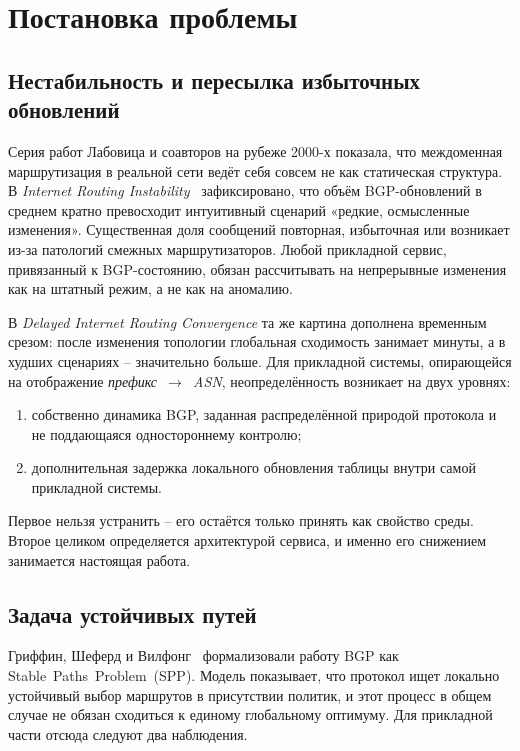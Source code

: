 \section{Постановка проблемы}
\label{sec:bgp-dynamics}

\subsection{Нестабильность и пересылка избыточных обновлений}

Серия работ Лабовица и соавторов на рубеже 2000-х показала, что
междоменная маршрутизация в реальной сети ведёт себя совсем не как
статическая структура. В \textit{Internet Routing
Instability}~\cite{labovitz1997instability} зафиксировано, что объём
BGP-обновлений в среднем кратно превосходит интуитивный сценарий
«редкие, осмысленные изменения». Существенная доля сообщений
повторная, избыточная или возникает из-за патологий смежных
маршрутизаторов. Любой прикладной сервис, привязанный к
BGP-состоянию, обязан рассчитывать на непрерывные изменения как на штатный
режим, а не как на аномалию.

В \textit{Delayed Internet Routing Convergence}
\cite{labovitz2000convergence} та же картина дополнена временным
срезом: после изменения топологии глобальная сходимость занимает
минуты, а в худших сценариях -- значительно больше. Для прикладной
системы, опирающейся на отображение
\textit{префикс~$\rightarrow$~ASN}, неопределённость возникает на двух
уровнях:

\begin{enumerate}
\item собственно динамика BGP, заданная распределённой природой
протокола и не поддающаяся одностороннему контролю;
\item дополнительная задержка локального обновления таблицы внутри
самой прикладной системы.
\end{enumerate}

Первое нельзя устранить -- его остаётся только принять как свойство
среды. Второе целиком определяется архитектурой сервиса, и именно его
снижением занимается настоящая работа.

\subsection{Задача устойчивых путей}

Гриффин, Шеферд и Вилфонг~\cite{griffin2002stablepaths} формализовали
работу BGP как Stable~Paths~Problem~(SPP). Модель показывает, что
протокол ищет локально устойчивый выбор маршрутов в присутствии
политик, и этот процесс в общем случае не обязан сходиться к единому
глобальному оптимуму. Для прикладной части отсюда следуют два
наблюдения.

